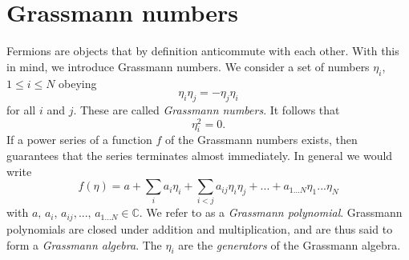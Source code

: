 \section{Grassmann numbers}
Fermions are objects that by definition anticommute with each other. 
With this in mind, we introduce Grassmann numbers.
We consider a set of numbers $\eta_i$, $1\leq i\leq N$ obeying
\begin{equation}
  \eta_i\eta_j=-\eta_j\eta_i
\end{equation}
for all $i$ and $j$. These are called {\it Grassmann numbers}.
It follows that
\begin{equation}\label{eq:gnilpotent}
  \eta_i^2=0.
\end{equation}
If a power series of a function $f$ of the Grassmann numbers exists, then
 guarantees that the series terminates almost
immediately. In general we would write
\begin{equation}\label{eq:grasspoly}
  f(\eta)=a+\sum_ia_i\eta_i+\sum_{i<j}a_{ij}\eta_i\eta_j
           +...+a_{1...N}\eta_1...\eta_N
\end{equation}
with $a,\,a_i,\,a_{ij},...,\,a_{1...N}\in\mathbb{C}$.
We refer to  as a {\it Grassmann polynomial}.
Grassmann polynomials are closed under addition and multiplication,
and are thus said to form a {\it Grassmann algebra}. The $\eta_i$
are the {\it generators} of the Grassmann algebra.

